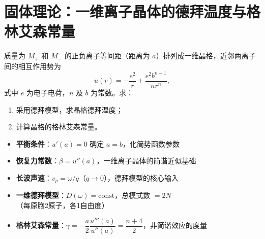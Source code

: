 \section{固体理论：一维离子晶体的德拜温度与格林艾森常量}
\label{sec:1d-ionic-debye-gruneisen}

\begin{modelbox}[题目：一维离子晶体的德拜温度与格林艾森常量]
质量为 $M_+$ 和 $M_-$ 的正负离子等间距（距离为 $a$）排列成一维晶格，近邻两离子间的相互作用势为
\begin{equation}
u(r)=-\frac{e^2}{r}+\frac{e^2b^{n-1}}{nr^n},
\end{equation}
式中 $e$ 为电子电荷，$n$ 及 $b$ 为常数。求：
\begin{enumerate}
    \item 采用德拜模型，求晶格德拜温度；
    \item 计算晶格的格林艾森常量。
\end{enumerate}
\end{modelbox}

\begin{tipbox}[考点快速分析]
\begin{itemize}
    \item \textbf{平衡条件}：$u'(a)=0$ 确定 $a=b$，化简势函数参数
    \item \textbf{恢复力常数}：$\beta=u''(a)$，一维离子晶体的简谐近似基础
    \item \textbf{长波声速}：$v_p=\omega/q$（$q\to0$），德拜模型的核心输入
    \item \textbf{一维德拜模型}：$D(\omega)=\text{const}$，总模式数 $=2N$（每原胞2原子，各1自由度）
    \item \textbf{格林艾森常量}：$\gamma=-\dfrac{a}{2}\dfrac{u'''(a)}{u''(a)}=\dfrac{n+4}{2}$，非简谐效应的度量
\end{itemize}
\end{tipbox}

